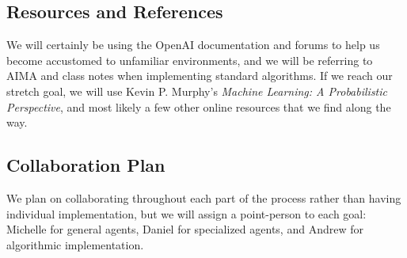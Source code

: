 \documentclass{NSF}
\begin{document}
\subsection{Resources and References}
We will certainly be using the OpenAI documentation and forums to help us become accustomed to unfamiliar environments, and we will be referring to AIMA and class notes when implementing standard algorithms. If we reach our stretch goal, we will use Kevin P. Murphy's \emph{Machine Learning: A Probabilistic Perspective}, and most likely a few other online resources that we find along the way.

\subsection{Collaboration Plan}
We plan on collaborating throughout each part of the process rather than having individual implementation, but we will assign a point-person to each goal: Michelle for general agents, Daniel for specialized agents, and Andrew for algorithmic implementation.
\end{document}

